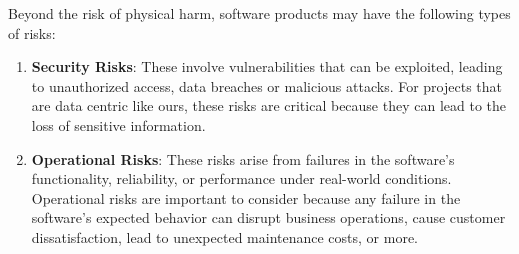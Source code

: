 \documentclass{article}
\begin{document}
\begin{enumerate}
    Beyond the risk of physical harm, software products may have the following types of risks:
    \begin{enumerate}
      \item \textbf{Security Risks}: These involve vulnerabilities that can be exploited, leading to unauthorized access, data breaches
      or malicious attacks. For projects that are data centric like ours, these risks are critical because they can lead to the loss of
      sensitive information.
      \item \textbf{Operational Risks}: These risks arise from failures in the software's functionality, reliability, or performance under 
      real-world conditions. Operational risks are important to consider because any failure in the software’s expected behavior can disrupt 
      business operations, cause customer dissatisfaction, lead to unexpected maintenance costs, or more.
    \end{enumerate}
\end{enumerate}
\end{document}
